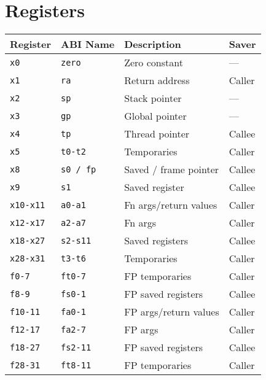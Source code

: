 \section*{Registers}

\begin{tabular} {l | l | l | l} \hline
Register     & ABI Name     & Description           & Saver  \\ \hline
\tt{x0}      & \tt{zero}    & Zero constant         & ---    \\
\tt{x1}      & \tt{ra}      & Return address        & Caller \\
\tt{x2}      & \tt{sp}      & Stack pointer         & ---    \\
\tt{x3}      & \tt{gp}      & Global pointer        & ---    \\
\tt{x4}      & \tt{tp}      & Thread pointer        & Callee \\
\tt{x5}      & \tt{t0-t2}   & Temporaries           & Caller \\
\tt{x8}      & \tt{s0 / fp} & Saved / frame pointer & Callee \\
\tt{x9}      & \tt{s1}      & Saved register        & Callee \\
\tt{x10-x11} & \tt{a0-a1}   & Fn args/return values & Caller \\
\tt{x12-x17} & \tt{a2-a7}   & Fn args               & Caller \\
\tt{x18-x27} & \tt{s2-s11}  & Saved registers       & Callee \\
\tt{x28-x31} & \tt{t3-t6}   & Temporaries           & Caller \\ \hline
\tt{f0-7}    & \tt{ft0-7}   & FP temporaries        & Caller \\
\tt{f8-9}    & \tt{fs0-1}   & FP saved registers    & Callee \\
\tt{f10-11}  & \tt{fa0-1}   & FP args/return values & Caller \\
\tt{f12-17}  & \tt{fa2-7}   & FP args               & Caller \\
\tt{f18-27}  & \tt{fs2-11}  & FP saved registers    & Callee \\
\tt{f28-31}  & \tt{ft8-11}  & FP temporaries        & Caller \\ \hline
\end{tabular}

